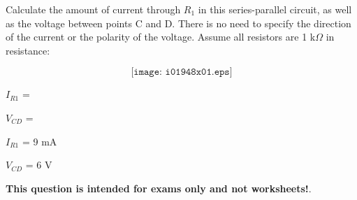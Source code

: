 

Calculate the amount of current through $R_1$ in this series-parallel circuit, as well as the voltage between points C and D.  There is no need to specify the direction of the current or the polarity of the voltage.  Assume all resistors are 1 k$\Omega$ in resistance:

$$\texttt{[image: i01948x01.eps]}$$

$I_{R1}$ = 

\vskip 10pt

$V_{CD}$ = 

\vskip 10pt







$I_{R1}$ = 9 mA

\vskip 10pt

$V_{CD}$ = 6 V







{\bf This question is intended for exams only and not worksheets!}.


